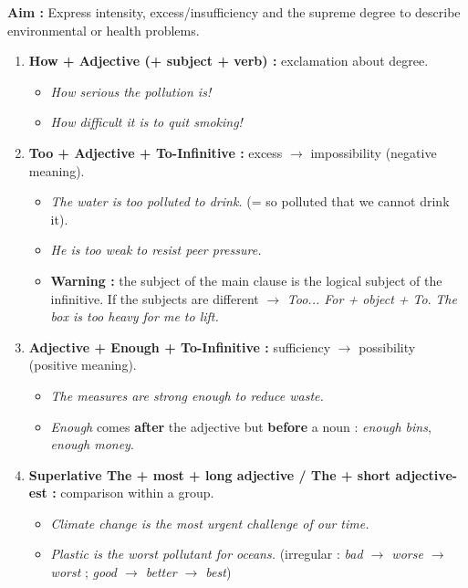 \documentclass[11pt]{article}
\newcommand{\cle}[1]{{\popxbold\color{popdark}#1}}
\begin{document}
\begin{methode}
\textbf{Aim :} Express intensity, excess/insufficiency and the supreme degree to describe environmental or health problems.
\begin{enumerate}
    \item \textbf{\cle{How + Adjective (+ subject + verb)} :} exclamation about degree.
    \begin{itemize}
        \item \textit{How \cle{serious} the pollution is!}
        \item \textit{How \cle{difficult} it is to quit smoking!}
    \end{itemize}
    \item \textbf{\cle{Too + Adjective + To-Infinitive} :} excess $\rightarrow$ impossibility (negative meaning).
    \begin{itemize}
        \item \textit{The water is \cle{too polluted to drink}.} (= so polluted that we cannot drink it).
        \item \textit{He is \cle{too weak to resist} peer pressure.}
        \item \textbf{Warning :} the subject of the main clause is the logical subject of the infinitive. If the subjects are different $\rightarrow$ \textit{Too... For + object + To}. \textit{The box is too heavy \cle{for me to lift}.}
    \end{itemize}
    \item \textbf{\cle{Adjective + Enough + To-Infinitive} :} sufficiency $\rightarrow$ possibility (positive meaning).
    \begin{itemize}
        \item \textit{The measures are \cle{strong enough to reduce} waste.}
        \item \textit{Enough} comes \textbf{after} the adjective but \textbf{before} a noun : \textit{enough bins}, \textit{enough money}.
    \end{itemize}
    \item \textbf{Superlative \cle{The + most + long adjective} / \cle{The + short adjective-est} :} comparison within a group.
    \begin{itemize}
        \item \textit{Climate change is \cle{the most urgent} challenge of our time.}
        \item \textit{Plastic is \cle{the worst} pollutant for oceans.} (irregular : \textit{bad $\rightarrow$ worse $\rightarrow$ worst} ; \textit{good $\rightarrow$ better $\rightarrow$ best})

\end{itemize}
\end{enumerate}
\end{methode}
\end{document}

